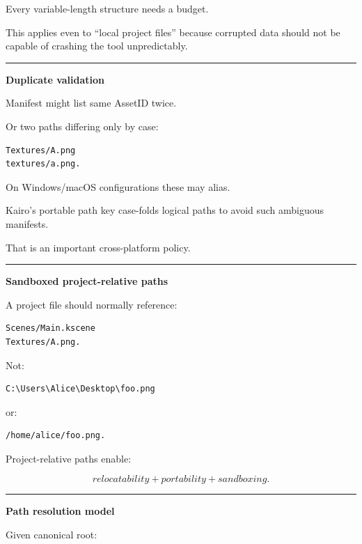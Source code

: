 Every variable-length structure needs a budget.

This applies even to ``local project files'' because corrupted data should not be capable of crashing the tool unpredictably.

\begin{center}\rule{0.5\linewidth}{0.5pt}\end{center}

\textbf{Duplicate validation}

Manifest might list same AssetID twice.

Or two paths differing only by case:

\begin{verbatim}
Textures/A.png
textures/a.png.
\end{verbatim}

On Windows/macOS configurations these may alias.

Kairo's portable path key case-folds logical paths to avoid such ambiguous manifests.

That is an important cross-platform policy.

\begin{center}\rule{0.5\linewidth}{0.5pt}\end{center}

\textbf{Sandboxed project-relative paths}

A project file should normally reference:

\begin{verbatim}
Scenes/Main.kscene
Textures/A.png.
\end{verbatim}

Not:

\begin{verbatim}
C:\Users\Alice\Desktop\foo.png
\end{verbatim}

or:

\begin{verbatim}
/home/alice/foo.png.
\end{verbatim}

Project-relative paths enable:

\[
\boxed{
relocatability
+
portability
+
sandboxing.
}
\]

\begin{center}\rule{0.5\linewidth}{0.5pt}\end{center}

\textbf{Path resolution model}

Given canonical root:

